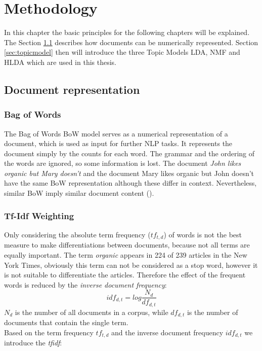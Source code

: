 \chapter{Methodology}
In this chapter the basic principles for the following chapters will be explained.
The Section \ref{sec:docrep} describes how documents can be numerically represented. Section \ref{sec:topicmodel} then will introduce the three Topic Models \ac{LDA}, \ac{NMF} and \ac{HLDA} which are used in this thesis.

\section{Document representation}
\label{sec:docrep}

\subsection{Bag of Words}
The Bag of Words \ac{BoW} model serves as a numerical representation of a document, which is used as input for further \ac{NLP} tasks.
It represents the document simply by the counts for each word. The grammar and the ordering of the words are ignored, so some information is lost. The document \textit{John likes organic but Mary doesn't} and the document {Mary likes organic but John doesn't} have the same \ac{BoW} representation although these differ in context. Nevertheless, similar \ac{BoW} imply similar document content (\cite{Manning2008}). 

\subsection{Tf-Idf Weighting}
Only considering the absolute term frequency ($tf_{t,d}$) of words is not the best measure to make differentiations between documents, because not all terms are equally important. 
The term \textit{organic} appears in  224 of 239 articles in the New York Times, obviously this term can not be considered as a stop word, however it is not suitable to differentiate the articles. Therefore the effect of the frequent words is reduced by the \textit{inverse document frequency}:
\begin{equation}
	idf_{d,t} = log\dfrac{N_{d}}{df_{d,t}}
\end{equation}
$N_{d}$ is the number of all documents in a corpus, while $df_{d,t}$ is the number of documents that contain the single term.\\
Based on the term frequency $tf_{t,d}$ and the inverse document frequency $idf_{d,t}$ we introduce the \textit{\ac{tfidf}}: 

